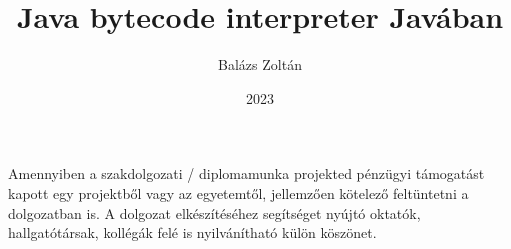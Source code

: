 \documentclass[
]{elteikthesis}[2022/04/30]
\title{Java bytecode interpreter Javában} %
\date{2023} %
\author{Balázs Zoltán}
\affiliation{egyetemi docens} %
\begin{document}


\maketitle
%

\tableofcontents
\cleardoublepage{}


\cleardoublepage{}


\cleardoublepage{}


\cleardoublepage{}


\cleardoublepage{}

\chapter*{\acklabel}
Amennyiben a szakdolgozati / diplomamunka projekted pénzügyi támogatást kapott egy projektből vagy az egyetemtől, jellemzően kötelező feltüntetni a dolgozatban is. A dolgozat elkészítéséhez segítséget nyújtó oktatók, hallgatótársak, kollégák felé is nyilvánítható külön köszönet.

\appendix

\cleardoublepage{}

\printbibliography[title=\biblabel]
\cleardoublepage{}

\listoffigures
\cleardoublepage{}

\listoftables
\cleardoublepage{}

\listofalgorithms{}
\cleardoublepage{}

\lstlistoflistings{}
\cleardoublepage{}

\end{document}
